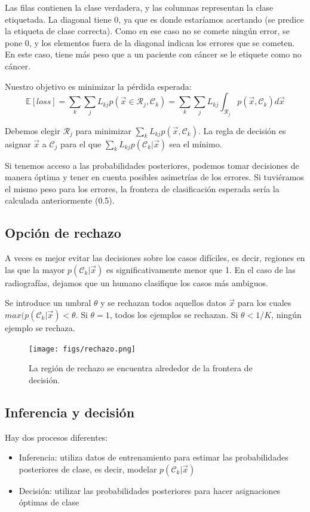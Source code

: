 Las filas contienen la clase verdadera, y las columnas representan la clase etiquetada. La diagonal tiene 0, ya que es donde estaríamos acertando (se predice la etiqueta de clase correcta). Como en ese caso no se comete ningún error, se pone 0, y los elementos fuera de la diagonal indican los errores que se cometen. En este caso, tiene más peso que a un paciente con cáncer se le etiquete como no cáncer.

Nuestro objetivo es minimizar la pérdida esperada:
$$\mathbb{E}[loss] = \sum_k \sum_j L_{kj} p(\vec{x} \in \mathcal{R}_j, \mathcal{C}_k) = \sum_k \sum_j L_{kj} \int_{\mathcal{R}_j} p(\vec{x}, \mathcal{C}_k) d \vec{x}$$

Debemos elegir $\mathcal{R}_j$ para minimizar $\sum_k L_{kj} p(\vec{x}, \mathcal{C}_k)$. La regla de decisión es asignar $\vec{x}$ a $\mathcal{C}_j$ para el que $\sum_k L_{kj} p(\mathcal{C}_k | \vec{x})$ sea el mínimo.

Si tenemos acceso a las probabilidades posteriores, podemos tomar decisiones de manera óptima y tener en cuenta posibles asimetrías de los errores. Si tuviéramos el mismo peso para los errores, la frontera de clasificación esperada sería la calculada anteriormente (0.5).

\subsection{Opción de rechazo}
A veces es mejor evitar las decisiones sobre los casos difíciles, es decir, regiones en las que la mayor $p(\mathcal{C}_k | \vec{x})$ es significativamente menor que 1. En el caso de las radiografías, dejamos que un humano clasifique los casos más ambiguos. 

Se introduce un umbral $\theta$ y se rechazan todos aquellos datos $\vec{x}$ para los cuales $max (p(\mathcal{C}_k | \vec{x}) < \theta$. Si $\theta = 1$, todos los ejemplos se rechazan. Si $\theta < 1/K$, ningún ejemplo se rechaza.

\begin{figure}[h]
\centering
\texttt{[image: figs/rechazo.png]}
\caption{La región de rechazo se encuentra alrededor de la frontera de decisión.}
\end{figure}

\subsection{Inferencia y decisión}
Hay dos procesos diferentes:
\begin{itemize}
\item Inferencia: utiliza datos de entrenamiento para estimar las probabilidades posteriores de clase, es decir, modelar $p(\mathcal{C}_k | \vec{x})$
\item Decisión: utilizar las probabilidades posteriores para hacer asignaciones óptimas de clase
\end{itemize}

